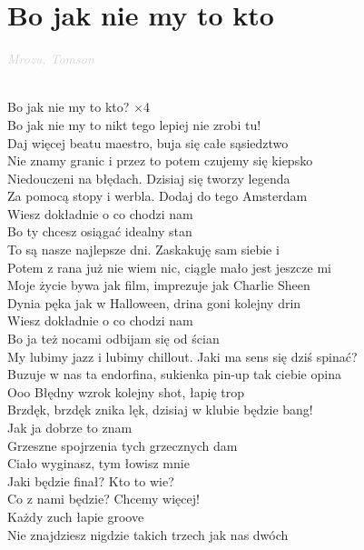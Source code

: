 \documentclass[a5paper, 10pt]{book}
\begin{document}
\section{Bo jak nie my to kto}\textcolor{lightgray}{\textit{Mrozu, Tomson}}\\~\\
\begin{minipage}[t]{0.8\textwidth}
  \hspace*{5mm}Bo jak nie my to kto? $\times 4$\\
  \hspace*{5mm}Bo jak nie my to nikt tego lepiej nie zrobi tu!\\

  Daj więcej beatu maestro, buja się całe sąsiedztwo\\
  Nie znamy granic i przez to potem czujemy się kiepsko\\
  Niedouczeni na błędach. Dzisiaj się tworzy legenda\\
  Za pomocą stopy i werbla. Dodaj do tego Amsterdam\\
  Wiesz dokładnie o co chodzi nam\\
  Bo ty chcesz osiągać idealny stan\\

  To są nasze najlepsze dni. Zaskakuję sam siebie i\\
  Potem z rana już nie wiem nic, ciągle mało jest jeszcze mi\\
  Moje życie bywa jak film, imprezuje jak Charlie Sheen\\
  Dynia pęka jak w Halloween, drina goni kolejny drin\\
  Wiesz dokładnie o co chodzi nam\\
  Bo ja też nocami odbijam się od ścian\\

  My lubimy jazz i lubimy chillout. Jaki ma sens się dziś spinać?\\
  Buzuje w nas ta endorfina, sukienka pin-up tak ciebie opina\\
  Ooo Błędny wzrok kolejny shot, łapię trop\\
  Brzdęk, brzdęk znika lęk, dzisiaj w klubie będzie bang!\\
  Jak ja dobrze to znam\\
  Grzeszne spojrzenia tych grzecznych dam\\

  Ciało wyginasz, tym łowisz mnie\\
  Jaki będzie finał? Kto to wie?\\
  Co z nami będzie? Chcemy więcej!\\
  Każdy zuch łapie groove\\
  Nie znajdziesz nigdzie takich trzech jak nas dwóch\\
\end{minipage}
\end{document}
